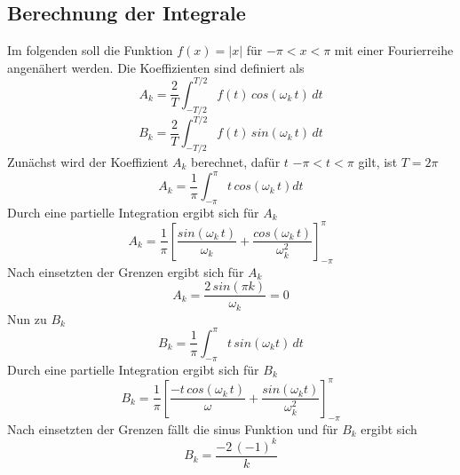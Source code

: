 \subsection{Berechnung der Integrale}
    Im folgenden soll die Funktion $f(x)=|x|$ für $-\pi < x < \pi$ mit einer Fourierreihe angenähert werden.
    Die Koeffizienten sind definiert als
\begin{equation}
  A_k=\frac{2}{T} \int_{-T/2}^{T/2} f(t) \, cos(\omega_k \, t) \,  dt
\end{equation}
\begin{equation}
  B_k=\frac{2}{T} \int_{-T/2}^{T/2} f(t) \, sin(\omega_k \, t) \, dt
\end{equation}
  Zunächst wird der Koeffizient $A_k$ berechnet, dafür $t$  $-\pi < t < \pi$ gilt, ist $T = 2\pi$
\begin{equation}
  A_k = \frac{1}{\pi} \int_{-\pi}^{\pi} t \, cos(\omega_k\, t) dt
\end{equation}
  Durch eine partielle Integration ergibt sich für $A_k$
\begin{equation}
  A_k= \frac{1}{\pi} \left [\frac{sin(\omega_k \, t)}{\omega_k} + \frac{cos(\omega_k \, t)}{\omega_k^2}  \right]_{-\pi}^{\pi} 
\end{equation}
  Nach einsetzten der Grenzen ergibt sich für $A_k$
\begin{equation}
  A_k = \frac{2 \, sin(\pi k)}{\omega_k} = 0
\end{equation}
  Nun zu $B_k$
\begin{equation}
  B_k = \frac{1}{\pi} \int_{-\pi}^{\pi} t \, sin (\omega_k t) \, dt
\end{equation}
  Durch eine partielle Integration ergibt sich für $B_k$
\begin{equation}
  B_k = \frac{1}{\pi} \left [\frac{- t \, cos(\omega_k \,  t)}{\omega} + \frac{sin(\omega_k t)}{\omega_k^2}\right]_{-\pi}^{\pi} 
\end{equation}
  Nach einsetzten der Grenzen fällt die sinus Funktion und für $B_k$ ergibt sich
\begin{equation}
  B_k = \frac{-2 \, (-1)^k}{k}
\end{equation}
